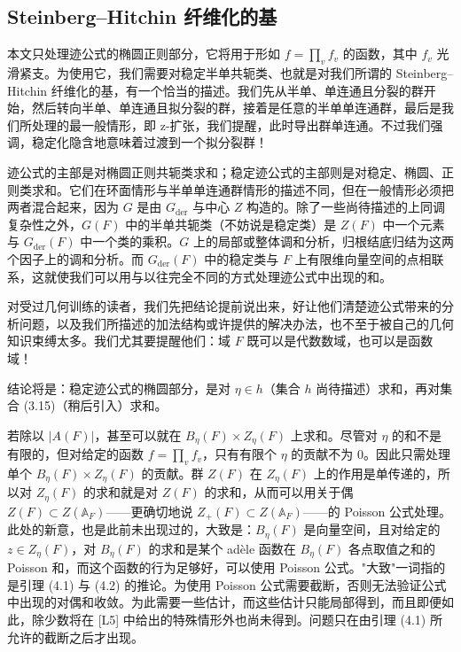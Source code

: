 \subsection{Steinberg–Hitchin 纤维化的基}

本文只处理迹公式的椭圆正则部分，它将用于形如 $f=\prod_vf_v$ 的函数，其中 $f_v$ 光滑紧支。为使用它，我们需要对稳定半单共轭类、也就是对我们所谓的 Steinberg–Hitchin 纤维化的基，有一个恰当的描述。我们先从半单、单连通且分裂的群开始，然后转向半单、单连通且拟分裂的群，接着是任意的半单单连通群，最后是我们所处理的最一般情形，即 z-扩张，我们提醒，此时导出群单连通。不过我们强调，稳定化隐含地意味着过渡到一个拟分裂群！

迹公式的主部是对椭圆正则共轭类求和；稳定迹公式的主部则是对稳定、椭圆、正则类求和。它们在环面情形与半单单连通群情形的描述不同，但在一般情形必须把两者混合起来，因为 $G$ 是由 $G_{\mathrm{der}}$ 与中心 $Z$ 构造的。除了一些尚待描述的上同调复杂性之外，$G(F)$ 中的半单共轭类（不妨说是稳定类）是 $Z(F)$ 中一个元素与 $G_{\mathrm{der}}(F)$ 中一个类的乘积。$G$ 上的局部或整体调和分析，归根结底归结为这两个因子上的调和分析。而 $G_{\mathrm{der}}(F)$ 中的稳定类与 $F$ 上有限维向量空间的点相联系，这就使我们可以用与以往完全不同的方式处理迹公式中出现的和。

对受过几何训练的读者，我们先把结论提前说出来，好让他们清楚迹公式带来的分析问题，以及我们所描述的加法结构或许提供的解决办法，也不至于被自己的几何知识束缚太多。我们尤其要提醒他们：域 $F$ 既可以是代数数域，也可以是函数域！

结论将是：稳定迹公式的椭圆部分，是对 $\eta\in h$（集合 $h$ 尚待描述）求和，再对集合 (3.15)（稍后引入）求和。

若除以 $|A(F)|$，甚至可以就在 $B_\eta(F)\times Z_\eta(F)$ 上求和。尽管对 $\eta$ 的和不是有限的，但对给定的函数 $f=\prod_vf_v$，只有有限个 $\eta$ 的贡献不为 $0$。因此只需处理单个 $B_\eta(F)\times Z_\eta(F)$ 的贡献。群 $Z(F)$ 在 $Z_\eta(F)$ 上的作用是单传递的，所以对 $Z_\eta(F)$ 的求和就是对 $Z(F)$ 的求和，从而可以用关于偶 $Z(F)\subset Z(\mathbb A_F)$——更确切地说 $Z_+(F)\subset Z(\mathbb A_F)$——的 Poisson 公式处理。此处的新意，也是此前未出现过的，大致是：$B_\eta(F)$ 是向量空间，且对给定的 $z\in Z_\eta(F)$，对 $B_\eta(F)$ 的求和是某个 adèle 函数在 $B_\eta(F)$ 各点取值之和的 Poisson 和，而这个函数的行为足够好，可以使用 Poisson 公式。"大致"一词指的是引理 (4.1) 与 (4.2) 的推论。为使用 Poisson 公式需要截断，否则无法验证公式中出现的对偶和收敛。为此需要一些估计，而这些估计只能局部得到，而且即便如此，除少数将在 [L5] 中给出的特殊情形外也尚未得到。问题只在由引理 (4.1) 所允许的截断之后才出现。

